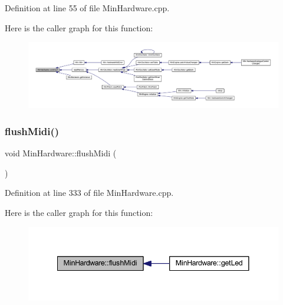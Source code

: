 Definition at line 55 of file Min\+Hardware.\+cpp.

Here is the caller graph for this function\+:
\nopagebreak
\begin{figure}[H]
\begin{center}
\leavevmode
\includegraphics[width=350pt]{d0/d93/class_min_hardware_a39382d7c1fcdcec2858c01c05d4c35aa_icgraph}
\end{center}
\end{figure}
\mbox{\label{class_min_hardware_a21e147f121461594f295852e0a856b64}} 
\subsubsection{\texorpdfstring{flush\+Midi()}{flushMidi()}}
{\footnotesize\ttfamily void Min\+Hardware\+::flush\+Midi (\begin{DoxyParamCaption}{ }\end{DoxyParamCaption})\hspace{0.3cm}{\ttfamily [static]}}



Definition at line 333 of file Min\+Hardware.\+cpp.

Here is the caller graph for this function\+:
\nopagebreak
\begin{figure}[H]
\begin{center}
\leavevmode
\includegraphics[width=341pt]{d0/d93/class_min_hardware_a21e147f121461594f295852e0a856b64_icgraph}
\end{center}
\end{figure}
\mbox{\label{class_min_hardware_a6960d088af0e6dabdd93d943a31906e3}} 

